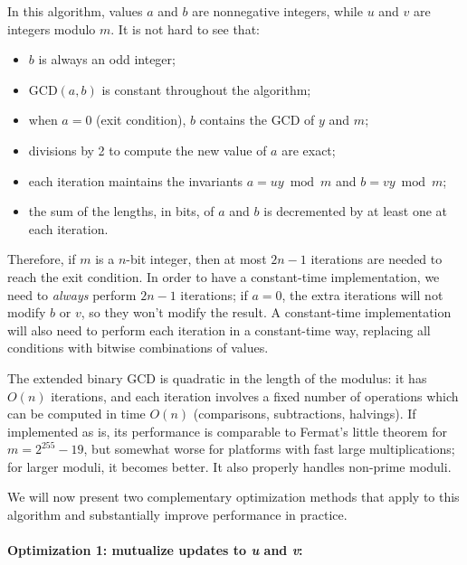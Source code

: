 \documentclass{llncs}
\begin{document}
In this algorithm, values $a$ and $b$ are nonnegative integers, while
$u$ and $v$ are integers modulo $m$. It is not hard to see that:
\begin{itemize}
    \item $b$ is always an odd integer;
    \item $\text{GCD}(a, b)$ is constant throughout the algorithm;
    \item when $a = 0$ (exit condition), $b$ contains the GCD of $y$
    and $m$;
    \item divisions by 2 to compute the new value of $a$ are exact;
    \item each iteration maintains the invariants $a = uy \bmod m$ and
    $b = vy \bmod m$;
    \item the sum of the lengths, in bits, of $a$ and $b$ is decremented
    by at least one at each iteration.
\end{itemize}
Therefore, if $m$ is a $n$-bit integer, then at most $2n-1$ iterations
are needed to reach the exit condition. In order to have a constant-time
implementation, we need to \emph{always} perform $2n-1$ iterations; if
$a = 0$, the extra iterations will not modify $b$ or $v$, so they won't
modify the result. A constant-time implementation will also need to
perform each iteration in a constant-time way, replacing all conditions
with bitwise combinations of values.

The extended binary GCD is quadratic in the length of the modulus: it
has $O(n)$ iterations, and each iteration involves a fixed number of
operations which can be computed in time $O(n)$ (comparisons,
subtractions, halvings). If implemented as is, its performance is
comparable to Fermat's little theorem for $m = 2^{255}-19$, but somewhat
worse for platforms with fast large multiplications; for larger moduli,
it becomes better. It also properly handles non-prime moduli.

We will now present two complementary optimization methods that apply to
this algorithm and substantially improve performance in practice.

\paragraph{Optimization 1: mutualize updates to \emph{u} and \emph{v}:}
\end{document}
